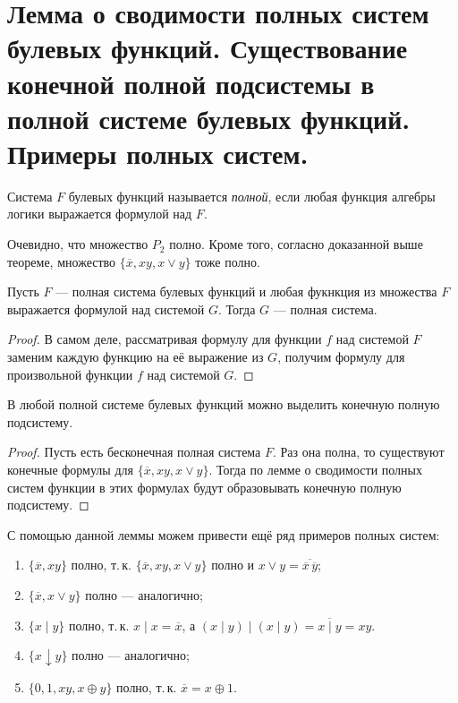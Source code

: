 \section{Лемма о сводимости полных систем булевых функций. Существование конечной полной подсистемы в полной системе булевых функций. Примеры полных систем.}

\begin{definition}
    Система $F$ булевых функций называется \textit{полной}, если любая функция алгебры логики выражается формулой над $F$.
\end{definition}

\begin{remark}
    Очевидно, что множество $P_2$ полно. Кроме того, согласно доказанной выше теореме, множество $\{\overline{x}, xy, x \vee y\}$ тоже полно.
\end{remark}

\begin{lemma}
    Пусть $F$ --- полная система булевых функций и любая фукнкция из множества $F$ выражается формулой над системой $G$. Тогда $G$ --- полная система.
\end{lemma}

\begin{proof}
    В самом деле, рассматривая формулу для функции $f$ над системой $F$ заменим каждую функцию на её выражение из $G$, получим формулу для произвольной функции $f$ над системой $G$.
\end{proof}

\begin{theorem}
    В любой полной системе булевых функций можно выделить конечную полную подсистему.
\end{theorem}

\begin{proof}
    Пусть есть бесконечная полная система $F$. Раз она полна, то существуют конечные формулы для $\{\overline{x}, xy, x \vee y\}$. Тогда по лемме о сводимости полных систем функции в этих формулах будут образовывать конечную полную подсистему.
\end{proof}

С помощью данной леммы можем привести ещё ряд примеров полных систем:
\begin{enumerate}
    \item $\{\overline{x}, xy\}$ полно, т.\,к. $\{\overline{x}, xy, x \vee y\}$ полно и $x \vee y = \overline{\overline{x} \, \overline{y}}$;
    \item $\{\overline{x}, x \vee y\}$ полно --- аналогично;
    \item $\{x \mid y\}$ полно, т.\,к. $x \mid x = \overline{x}$, а $(x \mid y) \mid (x \mid y) = \overline{x \mid y} = xy$.
    \item $\{x \downarrow y\}$ полно --- аналогично;
    \item $\{0, 1, xy, x \oplus y\}$ полно, т.\,к. $\overline{x} = x \oplus 1$.
\end{enumerate}